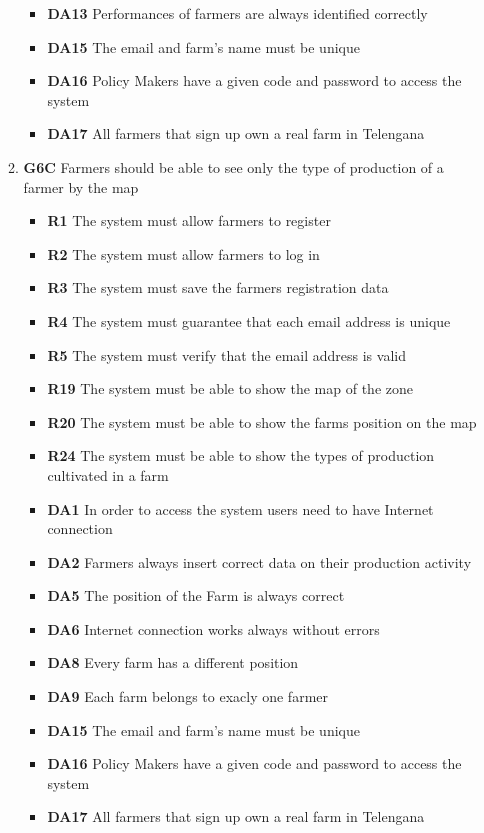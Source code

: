 \begin{itemize}
\begin{enumerate}
\begin{itemize}
                \item \textbf{DA13} Performances of farmers are always identified correctly
                \item \textbf{DA15} The email and farm's name must be unique
                \item \textbf{DA16} Policy Makers have a given code and password to access the system
                \item \textbf{DA17} All farmers that sign up own a real farm in Telengana
            \end{itemize}    
            \item \textbf{G6C} Farmers should be able to see only the type of production of a farmer by the map
            \begin{itemize}
                \renewcommand\labelitemi{--}
                \item \textbf{R1} The system must allow farmers to register
                \item \textbf{R2} The system must allow farmers to log in
                \item \textbf{R3} The system must save the farmers registration data
                \item \textbf{R4} The system must guarantee that each email address is unique
                \item \textbf{R5} The system must verify that the email address is valid
                \item \textbf{R19} The system must be able to show the map of the zone
                \item \textbf{R20} The system must be able to show the farms position on the map
                \item \textbf{R24} The system must be able to show the types of production cultivated in a farm
                \item \textbf{DA1} In order to access the system users need to have Internet connection
                \item \textbf{DA2} Farmers always insert correct data on their production activity
                \item \textbf{DA5} The position of the Farm is always correct
                \item \textbf{DA6} Internet connection works always without errors
                \item \textbf{DA8} Every farm has a different position
                \item \textbf{DA9} Each farm belongs to exacly one farmer
                \item \textbf{DA15} The email and farm's name must be unique
                \item \textbf{DA16} Policy Makers have a given code and password to access the system
                \item \textbf{DA17} All farmers that sign up own a real farm in Telengana
                
            \end{itemize}
        \end{enumerate}
    \end{itemize}
